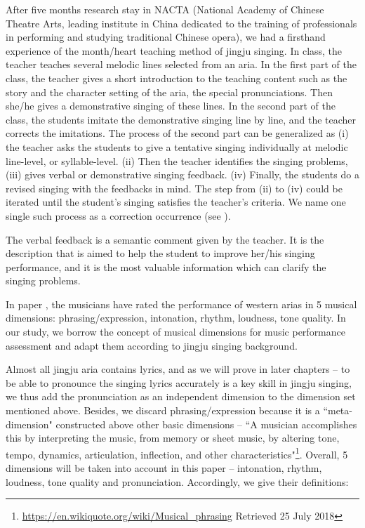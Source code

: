 After five months research stay in NACTA (National Academy of Chinese Theatre Arts, leading institute in China dedicated to the training of professionals in performing and studying traditional Chinese opera), we had a firsthand experience of the month/heart teaching method of jingju singing. In class, the teacher teaches several melodic lines selected from an aria. In the first part of the class, the teacher gives a short introduction to the teaching content such as the story and the character setting of the aria, the special pronunciations. Then she/he gives a demonstrative singing of these lines. In the second part of the class, the students imitate the demonstrative singing line by line, and the teacher corrects the imitations. The process of the second part can be generalized as (i) the teacher asks the students to give a tentative singing individually at melodic line-level, or syllable-level. (ii) Then the teacher identifies the singing problems, (iii) gives verbal or demonstrative singing feedback. (iv) Finally, the students do a revised singing with the feedbacks in mind. The step from (ii) to (iv) could be iterated until the student's singing satisfies the teacher's criteria. We name one single such process as a correction occurrence (see ).

The verbal feedback is a semantic comment given by the teacher. It is the description that is aimed to help the student to improve her/his singing performance, and it is the most valuable information which can clarify the singing problems.

In paper \cite{geringer_musicians_1998}, the musicians have rated the performance of western arias in 5 musical dimensions: phrasing/expression, intonation, rhythm, loudness, tone quality. In our study, we borrow the concept of musical dimensions for music performance assessment and adapt them according to jingju singing background. 

Almost all jingju aria contains lyrics, and as we will prove in later chapters -- to be able to pronounce the singing lyrics accurately is a key skill in jingju singing, we thus add the pronunciation as an independent dimension to the dimension set mentioned above. Besides, we discard phrasing/expression because it is a ``meta-dimension" constructed above other basic dimensions -- ``A musician accomplishes this by interpreting the music, from memory or sheet music, by altering tone, tempo, dynamics, articulation, inflection, and other characteristics"\footnote{\url{https://en.wikiquote.org/wiki/Musical_phrasing} Retrieved 25 July 2018}. Overall, 5 dimensions will be taken into account in this paper -- intonation, rhythm, loudness, tone quality and pronunciation. Accordingly, we give their definitions:

